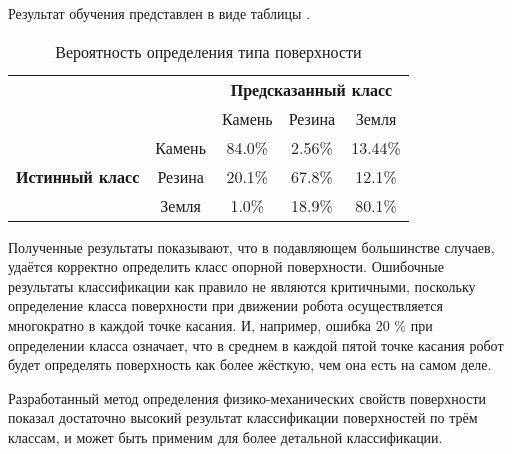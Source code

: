 Результат обучения представлен в виде таблицы .

\begin{table}[H]
    \caption{Вероятность определения типа поверхности}
    \label{tabular:prob_terrain_classification}
    \centering
\begin{tabular}{|c|c|c|c|c|} 
    \cline{3-5}
    \multicolumn{1}{l}{} & \multicolumn{1}{l|}{} & \multicolumn{3}{c|}{\textbf{Предсказанный класс}} \\ 
    \cline{3-5}
    \multicolumn{1}{l}{} &  & Камень & Резина & Земля \\ 
    \hline
    \multirow{3}{*}{{\textbf{Истинный класс}}} & Камень & {\cellcolor[rgb]{0.741,0.843,0.929}}84.0\% & 2.56\% & 13.44\% \\ 
    \hhline{|~----|}
     & Резина & 20.1\% & {\cellcolor[rgb]{0.741,0.843,0.929}}67.8\% & 12.1\% \\ 
    \hhline{|~----|}
     & Земля & 1.0\% & 18.9\% & {\cellcolor[rgb]{0.741,0.843,0.929}}80.1\% \\
    \hline
    \end{tabular}
\end{table}

Полученные результаты показывают, что в подавляющем большинстве случаев, удаётся корректно определить класс опорной поверхности. Ошибочные результаты классификации как правило не являются критичными, поскольку определение класса поверхности при движении робота осуществляется многократно в каждой точке касания. И, например, ошибка 20 \% при определении класса означает, что в среднем в каждой пятой точке касания робот будет определять поверхность как более жёсткую, чем она есть на самом деле.

Разработанный метод определения физико-механических свойств поверхности показал достаточно высокий результат классификации поверхностей по трём классам, и может быть применим для более детальной классификации.
